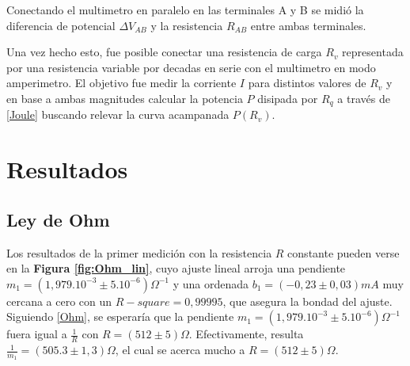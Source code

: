 \documentclass[11pt,a4paper]{article}
\begin{document}
Conectando el multimetro en paralelo en las terminales A y B se midió la diferencia de potencial $\Delta V_{AB}$ y la resistencia $R_{AB}$  entre ambas terminales.

Una vez hecho esto, fue posible conectar una resistencia de carga $R_v$ representada por una resistencia variable por decadas en serie con el multimetro en modo amperimetro. El objetivo fue medir la corriente $I$ para distintos valores de $R_v$ y en base a ambas magnitudes calcular la potencia $P$ disipada por $R_q$ a través de \eqref{Joule} buscando relevar la curva acampanada $P(R_v)$.




\section{Resultados}
\label{sec:discusion}

\subsection{Ley de Ohm}

Los resultados de la primer medición con la resistencia $R$ constante pueden verse en la \textbf{Figura \ref{fig:Ohm_lin}}, cuyo ajuste lineal arroja una pendiente $m_1 = (1,979.10^{-3} \pm 5.10^{-6})\Omega^{-1}$ y una ordenada $b_1 = (-0,23\pm 0,03)mA$ muy cercana a cero con un $R-square = 0,99995$, que asegura la bondad del ajuste. Siguiendo \eqref{Ohm}, se esperaría que la pendiente $m_1 = (1,979.10^{-3} \pm 5.10^{-6})\Omega^{-1}$ fuera igual a $\frac{1}{R}$ con $R = (512 \pm 5)\Omega$. Efectivamente, resulta $\frac{1}{m_1} = (505.3 \pm 1,3)\Omega$, el cual se acerca mucho a $R = (512 \pm 5)\Omega$.
\end{document}
